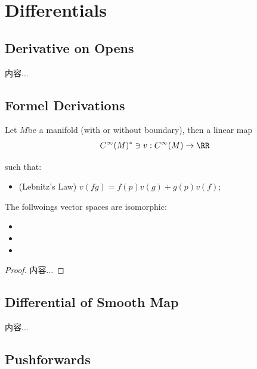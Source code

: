 \documentclass[Total.tex]{subfiles}
\begin{document}
		\section{Differentials}
			\subsection{Derivative on Opens}
				
				\begin{Def}
					内容...
				\end{Def}
				
			\subsection{Formel Derivations}
				\begin{Def}
					Let $M$be a manifold (with or without boundary), then a linear map
					\begin{gather*}
						C^\infty(M)^*\ni v:C^\infty(M)\rightarrow \RR
					\end{gather*}
					
					such that:
					\begin{itemize}
						\item (Lebnitz's Law) $v(fg)=f(p)v(g)+g(p)v(f)$;
					\end{itemize}
				\end{Def}
				
				\begin{proposition}
					The follwoings vector spaces are isomorphic:
					\begin{itemize}
						\item 
						\item 
						\item 
					\end{itemize}
				\end{proposition}
				\begin{proof}
					内容...
				\end{proof}
			\subsection{Differential of Smooth Map}
				\begin{Def}
					内容...
				\end{Def}
				
			\subsection{Pushforwards}
			
\end{document}
